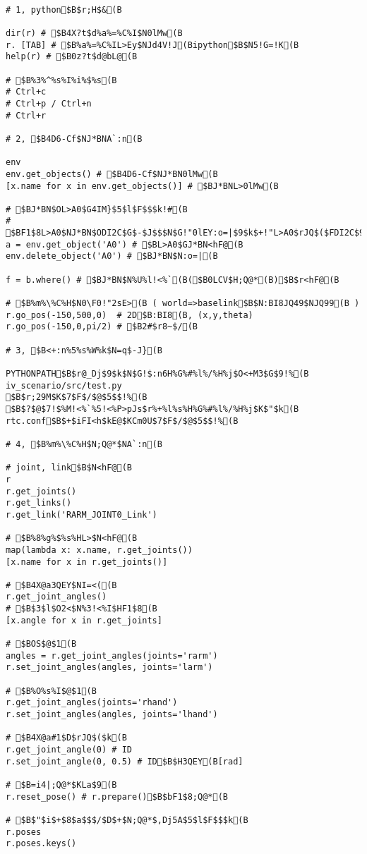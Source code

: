 \documentclass[11pt]{jarticle}
\begin{document}
{{{{\begin{verbatim}

# 1, python$B$r;H$&(B

dir(r) # $B4X?t$d%a%=%C%I$N0lMw(B
r. [TAB] # $B%a%=%C%IL>Ey$NJd4V!J(Bipython$B$N5!G=!K(B
help(r) # $B0z?t$d@bL@(B

# $B%3%^%s%I%i%$%s(B
# Ctrl+c
# Ctrl+p / Ctrl+n
# Ctrl+r

# 2, $B4D6-Cf$NJ*BNA`:n(B

env
env.get_objects() # $B4D6-Cf$NJ*BN0lMw(B
[x.name for x in env.get_objects()] # $BJ*BNL>0lMw(B

# $BJ*BN$OL>A0$G4IM}$5$l$F$$$k!#(B
# $BF1$8L>A0$NJ*BN$ODI2C$G$-$J$$$N$G!"0lEY:o=|$9$k$+!"L>A0$rJQ$($FDI2C$9$k!#(B
a = env.get_object('A0') # $BL>A0$GJ*BN<hF@(B
env.delete_object('A0') # $BJ*BN$N:o=|(B

f = b.where() # $BJ*BN$N%U%l!<%`(B($B0LCV$H;Q@*(B)$B$r<hF@(B

# $B%m%\%C%H$N0\F0!"2sE>(B ( world=>baselink$B$N:BI8JQ49$NJQ99(B )
r.go_pos(-150,500,0)  # 2D$B:BI8(B, (x,y,theta)
r.go_pos(-150,0,pi/2) # $B2#$r8~$/(B

# 3, $B<+:n%5%s%W%k$N=q$-J}(B

PYTHONPATH$B$r@_Dj$9$k$N$G!$:n6H%G%#%l%/%H%j$O<+M3$G$9!%(B
iv_scenario/src/test.py
$B$r;29M$K$7$F$/$@$5$$!%(B
$B$?$@$7!$%M!<%`%5!<%P>pJs$r%+%l%s%H%G%#%l%/%H%j$K$"$k(B
rtc.conf$B$+$iFI<h$kE@$KCm0U$7$F$/$@$5$$!%(B

# 4, $B%m%\%C%H$N;Q@*$NA`:n(B

# joint, link$B$N<hF@(B
r
r.get_joints()
r.get_links()
r.get_link('RARM_JOINT0_Link')

# $B%8%g%$%s%HL>$N<hF@(B
map(lambda x: x.name, r.get_joints())
[x.name for x in r.get_joints()]

# $B4X@a3QEY$NI=<((B
r.get_joint_angles()
# $B$3$l$O2<$N%3!<%I$HF1$8(B
[x.angle for x in r.get_joints]

# $BOS$@$1(B
angles = r.get_joint_angles(joints='rarm')
r.set_joint_angles(angles, joints='larm')

# $B%O%s%I$@$1(B
r.get_joint_angles(joints='rhand')
r.set_joint_angles(angles, joints='lhand')

# $B4X@a#1$D$rJQ$($k(B
r.get_joint_angle(0) # ID
r.set_joint_angle(0, 0.5) # ID$B$H3QEY(B[rad]

# $B=i4|;Q@*$KLa$9(B
r.reset_pose() # r.prepare()$B$bF1$8;Q@*(B

# $B$"$i$+$8$a$$$/$D$+$N;Q@*$,Dj5A$5$l$F$$$k(B
r.poses
r.poses.keys()


\end{verbatim}}}}}
\end{document}
